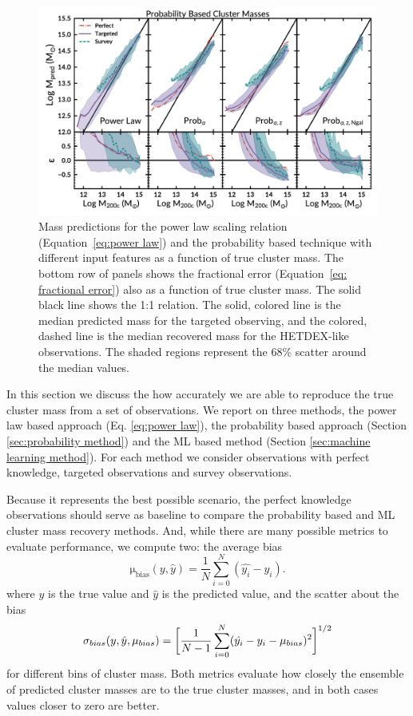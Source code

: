 \documentclass[fleqn,usenatbib]{mnras}
\begin{document}
\begin{figure} 
	\includegraphics[width=\textwidth]{figures/Probcomparison.pdf} 
	\caption{Mass predictions for the power law scaling relation (Equation~\ref{eq:power law}) and the probability based technique with different input features as a function of true cluster mass. The bottom row of panels shows the fractional error (Equation~\ref{eq: fractional error}) also as a function of true cluster mass. The solid black line shows the 1:1 relation. The solid, colored line is the median predicted mass for the targeted observing, and the colored, dashed line is the median recovered mass for the HETDEX-like observations. The shaded regions represent the 68\% scatter around the median values.} \label{fig:Probability comparison} 
\end{figure}

In this section we discuss the how accurately we are able to reproduce the true cluster mass from a set of observations. We report on three methods, the power law based approach (Eq. \ref{eq:power law}), the probability based approach (Section \ref{sec:probability method}) and the ML based method (Section \ref{sec:machine learning method}). For each method we consider observations with perfect knowledge, targeted observations and survey observations.

Because it represents the best possible scenario, the perfect knowledge observations should serve as baseline to compare the probability based and ML cluster mass recovery methods. And, while there are many possible metrics to evaluate performance, we compute two: the average bias 
\begin{equation}
\mathrm{\mu_{bias}}(y,\hat{y}) = \frac{1}{N} \sum_{i=0}^N (\hat{y_i} - y_i).\nonumber
\end{equation}
where $y$ is the true value and $\hat{y}$ is the predicted value, and the scatter about the bias
\begin{equation}
	\sigma_{bias}(y,\hat{y}, \mu_{bias}) = \bigg{[}\frac{1}{N-1} \sum_{i=0}^N (\hat{y_i} - y_i - \mu_{bias})^2 \bigg{]}^{1/2}\nonumber
\end{equation}
for different bins of cluster mass. Both metrics evaluate how closely the ensemble of predicted cluster masses are to the true cluster masses, and in both cases values closer to zero are better.
\end{document}
